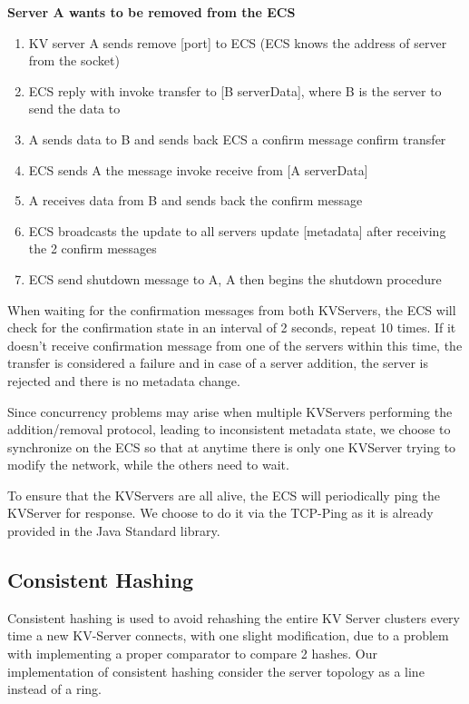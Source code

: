 \documentclass[sigconf]{acmart}
\begin{document}
\textbf{Server A wants to be removed from the ECS}
\begin{enumerate}
	\item {KV server A sends \colorbox{blue!30}{remove [port]} to ECS (ECS knows the address of server from the socket)}
	\item {ECS reply with \colorbox{blue!30}{invoke transfer to [B serverData]}, where B is the server to send the data to}
	\item {A sends data to B and sends back ECS a confirm message \colorbox{blue!30}{confirm transfer}}
	\item {ECS sends A the message \colorbox{blue!30}{invoke receive from [A serverData]}}
	\item {A receives data from B and sends back the confirm message}
	\item {ECS broadcasts the update to all servers  \colorbox{blue!30}{update [metadata]} after receiving the 2 confirm messages}
	\item {ECS send shutdown message to A, A then begins the shutdown procedure}
\end{enumerate} 

When waiting for the confirmation messages from both KVServers, the ECS will check for the confirmation state in an interval of 2 seconds, repeat 10 times. If it doesn't receive confirmation message from one of the servers within this time, the transfer is considered a failure and in case of a server addition, the server is rejected and there is no metadata change.

Since concurrency problems may arise when multiple KVServers performing the addition/removal protocol, leading to inconsistent metadata state, we choose to synchronize on the ECS so that at anytime there is only one KVServer trying to modify the network, while the others need to wait.

To ensure that the KVServers are all alive, the ECS will periodically ping the KVServer for response. We choose to do it via the TCP-Ping as it is already provided in the Java Standard library.


\subsection{Consistent Hashing}
Consistent hashing is used to avoid rehashing the entire KV Server clusters every time a new KV-Server connects, with one slight modification, due to a problem with implementing a proper comparator to compare 2 hashes. Our implementation of consistent hashing consider the server topology as a line instead of a ring. 
\end{document}
